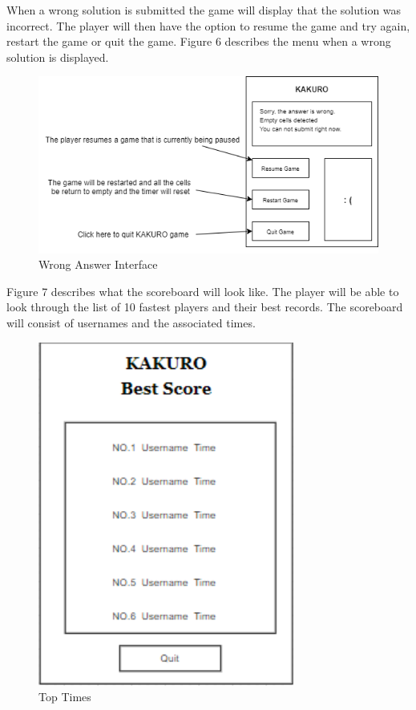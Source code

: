 \documentclass[12pt]{article}
\begin{document}
\newpage
When a wrong solution is submitted the game will display that the solution was incorrect. The player will then have the option to resume the game and try again, restart the game or quit the game. Figure 6 describes the menu when a wrong solution is displayed. 


\begin{figure}[htbp]
    \centering
    \includegraphics[scale=0.8]{UI-3.png}
    \caption{Wrong Answer Interface}
    \label{fig:UI-3}

\end{figure}

Figure 7 describes what the scoreboard will look like. The player will be able to look through the list of 10 fastest players and their best records. The scoreboard will consist of usernames and the associated times.

\begin{figure}[htbp]
    \centering
    \includegraphics[scale=0.8]{UI-4.png}
    \caption{Top Times}
    \label{fig:UI-4}
\end{figure}
\end{document}
